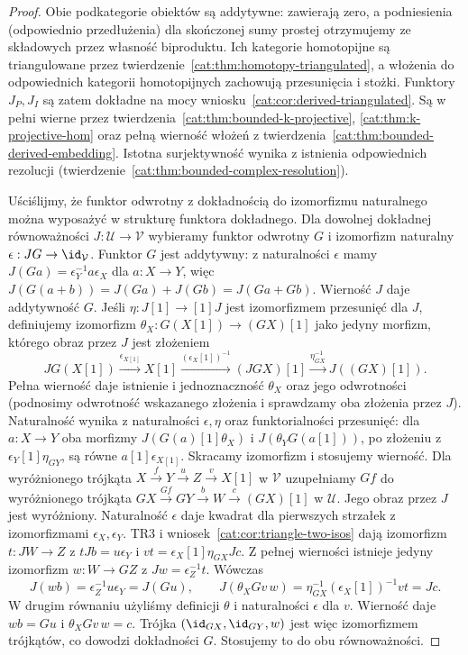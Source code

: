 \begin{proof}
Obie podkategorie obiektów są addytywne: zawierają zero, a podniesienia (odpowiednio przedłużenia) dla skończonej sumy prostej otrzymujemy ze składowych przez własność biproduktu. Ich kategorie homotopijne są triangulowane przez twierdzenie~\ref{cat:thm:homotopy-triangulated}, a włożenia do odpowiednich kategorii homotopijnych zachowują przesunięcia i stożki. Funktory $J_P,J_I$ są zatem dokładne na mocy wniosku~\ref{cat:cor:derived-triangulated}. Są w pełni wierne przez twierdzenia~\ref{cat:thm:bounded-k-projective}, \ref{cat:thm:k-projective-hom} oraz pełną wierność włożeń z twierdzenia~\ref{cat:thm:bounded-derived-embedding}. Istotna surjektywność wynika z istnienia odpowiednich rezolucji (twierdzenie~\ref{cat:thm:bounded-complex-resolution}).

Uściślijmy, że funktor odwrotny z dokładnością do izomorfizmu naturalnego można wyposażyć w strukturę funktora dokładnego. Dla dowolnej dokładnej równoważności $J:\mathcal U\to\mathcal V$ wybieramy funktor odwrotny $G$ i izomorfizm naturalny $\epsilon:JG\to\id_{\mathcal V}$. Funktor $G$ jest addytywny: z naturalności $\epsilon$ mamy $J(Ga)=\epsilon_Y^{-1}a\epsilon_X$ dla $a:X\to Y$, więc $J(G(a+b))=J(Ga)+J(Gb)=J(Ga+Gb)$. Wierność $J$ daje addytywność $G$. Jeśli $\eta:J[1]\to[1]J$ jest izomorfizmem przesunięć dla $J$, definiujemy izomorfizm $\theta_X:G(X[1])\to(GX)[1]$ jako jedyny morfizm, którego obraz przez $J$ jest złożeniem
\[
 JG(X[1])\xrightarrow{\epsilon_{X[1]}}X[1]
 \xrightarrow{(\epsilon_X[1])^{-1}}(JGX)[1]
 \xrightarrow{\eta_{GX}^{-1}}J((GX)[1]).
\]
Pełna wierność daje istnienie i jednoznaczność $\theta_X$ oraz jego odwrotności (podnosimy odwrotność wskazanego złożenia i sprawdzamy oba złożenia przez $J$). Naturalność wynika z naturalności $\epsilon,\eta$ oraz funktorialności przesunięć: dla $a:X\to Y$ oba morfizmy $J(G(a)[1]\theta_X)$ i $J(\theta_Y G(a[1]))$, po złożeniu z $\epsilon_Y[1]\eta_{GY}$, są równe $a[1]\epsilon_{X[1]}$. Skracamy izomorfizm i stosujemy wierność. Dla wyróżnionego trójkąta $X\xrightarrow fY\xrightarrow uZ\xrightarrow vX[1]$ w $\mathcal V$ uzupełniamy $Gf$ do wyróżnionego trójkąta $GX\xrightarrow{Gf}GY\xrightarrow bW\xrightarrow c(GX)[1]$ w $\mathcal U$. Jego obraz przez $J$ jest wyróżniony. Naturalność $\epsilon$ daje kwadrat dla pierwszych strzałek z izomorfizmami $\epsilon_X,\epsilon_Y$. TR3 i wniosek~\ref{cat:cor:triangle-two-isos} dają izomorfizm $t:JW\to Z$ z $tJb=u\epsilon_Y$ i $vt=\epsilon_X[1]\eta_{GX}Jc$. Z pełnej wierności istnieje jedyny izomorfizm $w:W\to GZ$ z $Jw=\epsilon_Z^{-1}t$. Wówczas
\[
 J(wb)=\epsilon_Z^{-1}u\epsilon_Y=J(Gu),
 \qquad
 J(\theta_X Gv\,w)=\eta_{GX}^{-1}(\epsilon_X[1])^{-1}vt=Jc.
\]
W drugim równaniu użyliśmy definicji $\theta$ i naturalności $\epsilon$ dla $v$. Wierność daje $wb=Gu$ i $\theta_X Gv\,w=c$. Trójka $(\id_{GX},\id_{GY},w)$ jest więc izomorfizmem trójkątów, co dowodzi dokładności $G$. Stosujemy to do obu równoważności.
\end{proof}
